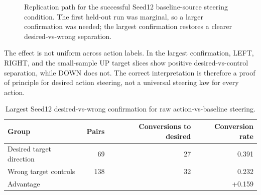 \documentclass[11pt]{article}
\begin{document}
\begin{figure}[t]
\centering
{}
\caption{Replication path for the successful Seed12 baseline-source steering condition. The first held-out run was marginal, so a larger confirmation was needed; the largest confirmation restores a clearer desired-vs-wrong separation.}
\label{fig:seed12_confirmation}
\end{figure}

The effect is not uniform across action labels.
In the largest confirmation, LEFT, RIGHT, and the small-sample UP target slices show positive desired-vs-control separation, while DOWN does not.
The correct interpretation is therefore a proof of principle for desired action steering, not a universal steering law for every action.

\begin{table}[t]
\centering
\caption{Largest Seed12 desired-vs-wrong confirmation for raw action-vs-baseline steering.}
\label{tab:seed12_confirm}
\begin{tabular}{lrrr}
\toprule
Group & Pairs & Conversions to desired & Conversion rate \\
\midrule
Desired target direction & 69 & 27 & 0.391 \\
Wrong target controls & 138 & 32 & 0.232 \\
\midrule
Advantage & & & +0.159 \\
\bottomrule
\end{tabular}
\end{table}
\end{document}
